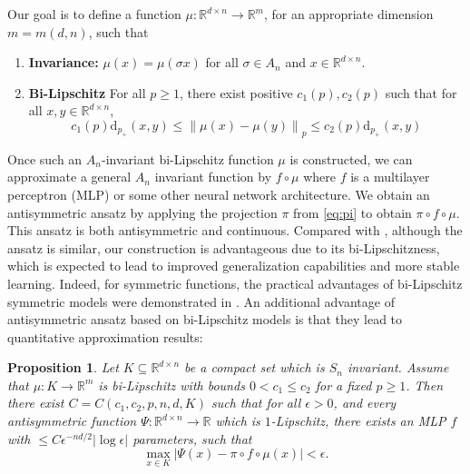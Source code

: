 \documentclass{amsart}
\theoremstyle{plain}
\newtheorem{prop}[theorem]{Proposition}
\theoremstyle{definition}
\theoremstyle{remark}
\newcommand{\RR}{\mathbb{R}}
\newcommand{\abs}[1]{\left\lvert#1\right\rvert}
\newcommand{\normp}[2]{\left\|#1\right\|_{#2}}
\newcommand{\dap}[1]{\mathrm{d}_{#1_+}}
\newcommand{\da}{\mathrm{d}_{+}}
\begin{document}
Our goal is to define a function $\mu:\RR^{d \times n} \to \RR^m$, for an appropriate dimension $m=m(d,n)$, such that 
\begin{enumerate}
	\item \textbf{Invariance:} $\mu(x)=\mu(\sigma x)$ for all $\sigma \in A_n$ and $x\in \RR^{d \times n}$.
	\item \textbf{Bi-Lipschitz} For all $p \geq 1$, there exist positive $c_1(p),c_2(p)$ such that for all $x,y\in \RR^{d \times n}$,
	\begin{equation}\label{eq:bilip}
	   c_1(p) \dap{p}(x,y)\leq \normp{\mu(x)-\mu(y)}{p} \leq c_2(p) \dap{p}(x,y)  
	\end{equation}
\end{enumerate}
Once such an $A_n$-invariant bi-Lipschitz function $\mu$ is constructed, we can approximate a general $A_n $ invariant function by $f\circ \mu $ where $f$ is a multilayer perceptron (MLP) or some other neural network architecture. We obtain an antisymmetric ansatz by applying the projection $\pi$ from \eqref{eq:pi} to obtain $\pi \circ f \circ \mu $. This ansatz is both antisymmetric and continuous. Compared with \cite{chen2023exact}, although the ansatz is similar, our construction is advantageous due to its bi-Lipschitzness, which is expected to lead to improved generalization capabilities and more stable learning. Indeed, for symmetric functions, the practical advantages of bi-Lipschitz symmetric models were demonstrated in \cites{fsw,fswgnn,davidson2024h}. An additional advantage of antisymmetric ansatz based on bi-Lipschitz models is that they lead to quantitative approximation results:
\begin{prop}
Let $K\subseteq \RR^{d\times n}$ be a compact set which is $S_n$ invariant. Assume that $\mu:K \to \RR^m$ is bi-Lipschitz with bounds $0<c_1 \leq c_2$ for a fixed $p\geq 1$. Then there exist $C=C\left(c_1,c_2, p,n,d,K \right)$ such that for all $\epsilon>0$, and every antisymmetric function $\Psi:\RR^{d\times n} \to \RR$ which is $1$-Lipschitz, there exists  an MLP $f$ with $\leq C\epsilon^{-nd/2} \abs{\log \epsilon} $ parameters, such that 
\begin{equation}
    \max_{x\in K}{\abs{\Psi(x)-\pi\circ f \circ \mu(x)}}<\epsilon. 
\end{equation}
\end{prop}
\end{document}
